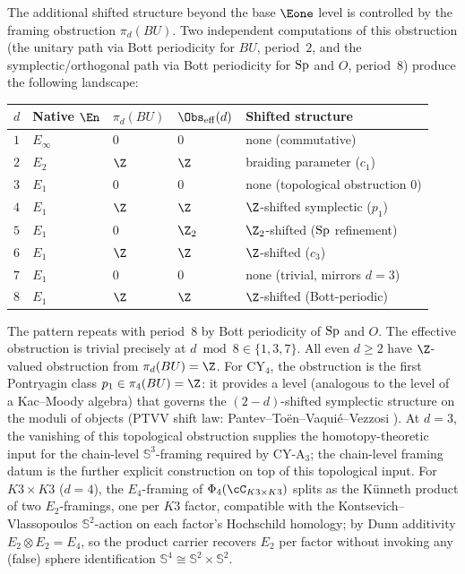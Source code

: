 The additional shifted structure beyond the base $\Eone$ level
is controlled by the framing obstruction $\pi_d(BU)$. Two
independent computations of this obstruction (the unitary path
via Bott periodicity for $BU$, period~$2$, and the
symplectic/orthogonal path via Bott periodicity for $\mathrm{Sp}$ and $O$,
period~$8$) produce the following landscape:
\begin{center}
\renewcommand{\arraystretch}{1.3}
\small
\begin{tabular}{lllll}
 \toprule
 $d$ & Native $\En$ & $\pi_d(BU)$
 & $\Obs_{\mathrm{eff}}(d)$ & Shifted structure \\
 \midrule
 $1$ & $E_\infty$ & $0$ & $0$ & none (commutative) \\
 $2$ & $E_2$ & $\Z$ & $\Z$ & braiding parameter ($c_1$) \\
 $3$ & $E_1$ & $0$ & $0$ & none (topological obstruction $0$) \\
 $4$ & $E_1$ & $\Z$ & $\Z$ & $\Z$-shifted symplectic ($p_1$) \\
 $5$ & $E_1$ & $0$ & $\Z_2$ & $\Z_2$-shifted ($\mathrm{Sp}$ refinement) \\
 $6$ & $E_1$ & $\Z$ & $\Z$ & $\Z$-shifted ($c_3$) \\
 $7$ & $E_1$ & $0$ & $0$ & none (trivial, mirrors $d = 3$) \\
 $8$ & $E_1$ & $\Z$ & $\Z$ & $\Z$-shifted (Bott-periodic) \\
 \bottomrule
\end{tabular}
\end{center}
The pattern repeats with period~$8$ by Bott periodicity of
$\mathrm{Sp}$ and $O$. The effective obstruction is trivial precisely
at $d \bmod 8 \in \{1, 3, 7\}$. All even $d \geq 2$ have
$\Z$-valued obstruction from $\pi_d(BU) = \Z$. For CY$_4$, the
obstruction is the first Pontryagin class
$p_1 \in \pi_4(BU) = \Z$: it provides a level (analogous to the
level of a Kac--Moody algebra) that governs the
$(2{-}d)$-shifted symplectic structure on the moduli of
objects (PTVV shift law: Pantev--To\"en--Vaqui\'e--Vezzosi
\cite{PTVV2013}). At $d = 3$, the vanishing of this topological obstruction supplies
the homotopy-theoretic input for the chain-level
$\mathbb{S}^3$-framing required by CY-A$_3$; the chain-level
framing datum is the further explicit construction on top of this
topological input. For $K3 \times K3$ ($d = 4$), the $E_4$-framing of
$\Phi_4(\cC_{K3 \times K3})$ splits as the K\"unneth product
of two $E_2$-framings, one per $K3$ factor, compatible with
the Kontsevich--Vlassopoulos $\mathbb{S}^2$-action on each
factor's Hochschild homology; by Dunn additivity
$E_2 \otimes E_2 = E_4$, so the product carrier recovers $E_2$
per factor without invoking any (false) sphere identification
$\mathbb{S}^4 \cong \mathbb{S}^2 \times \mathbb{S}^2$.

